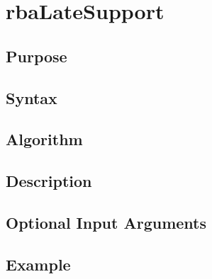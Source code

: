 
\chapter{rbaLateSupport} %
\label{cha:rbaLateSupport} %

\section{Purpose} %
\label{sec:rbaLateSupport_purpose}



\section{Syntax} %
\label{sec:rbaLateSupport_syntax}




\section{Algorithm} %
\label{sec:rbaLateSupport_algorithm}



\section{Description} %
\label{sec:rbaLateSupport_description}



\section{Optional Input Arguments} %
\label{sec:rbaLateSupport_optional_input_arguments}



\section{Example} %
\label{sec:rbaLateSupport_example}

